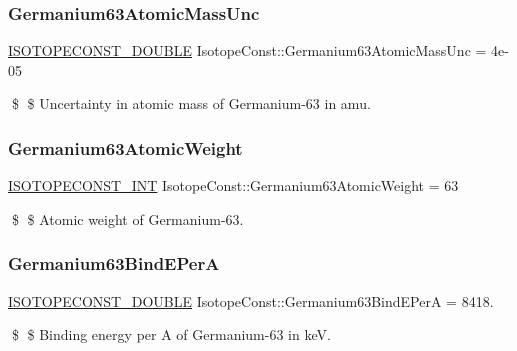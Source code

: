 \subsubsection{\texorpdfstring{Germanium63\+Atomic\+Mass\+Unc}{Germanium63AtomicMassUnc}}
{\footnotesize\ttfamily \mbox{\hyperlink{group___isotope_const-_macros_ga8f45a7272ce02c0b4c65c44636ed719a}{I\+S\+O\+T\+O\+P\+E\+C\+O\+N\+S\+T\+\_\+\+D\+O\+U\+B\+LE}} Isotope\+Const\+::\+Germanium63\+Atomic\+Mass\+Unc = 4e-\/05}

\$ \$ Uncertainty in atomic mass of Germanium-\/63 in amu. \mbox{\label{group___isotope_const-_germanium-_ge63_gac2fa1462d7116383885e8cf45a5171f7}} 
\subsubsection{\texorpdfstring{Germanium63\+Atomic\+Weight}{Germanium63AtomicWeight}}
{\footnotesize\ttfamily \mbox{\hyperlink{group___isotope_const-_macros_ga5f18360b3e99483a35c32d789e62621c}{I\+S\+O\+T\+O\+P\+E\+C\+O\+N\+S\+T\+\_\+\+I\+NT}} Isotope\+Const\+::\+Germanium63\+Atomic\+Weight = 63}

\$ \$ Atomic weight of Germanium-\/63. \mbox{\label{group___isotope_const-_germanium-_ge63_ga01db8930d7c38a3d3604a80aac2ac4e9}} 
\subsubsection{\texorpdfstring{Germanium63\+Bind\+E\+PerA}{Germanium63BindEPerA}}
{\footnotesize\ttfamily \mbox{\hyperlink{group___isotope_const-_macros_ga8f45a7272ce02c0b4c65c44636ed719a}{I\+S\+O\+T\+O\+P\+E\+C\+O\+N\+S\+T\+\_\+\+D\+O\+U\+B\+LE}} Isotope\+Const\+::\+Germanium63\+Bind\+E\+PerA = 8418.}

\$ \$ Binding energy per A of Germanium-\/63 in keV. \mbox{\label{group___isotope_const-_germanium-_ge63_ga715bd19d372e29815ad39c69abc086ea}} 
